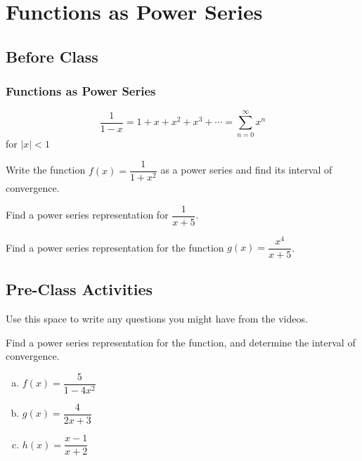 \documentclass[notes]{subfiles}
\begin{document}
	\fancyhead[LO,RE]{\bfseries \small \currentname}
	\fancyfoot[C]{{}}
	\fancyfoot[RO,LE]{\large \thepage}	%
	
\section*{Functions as Power Series}\label{cs119}
	\subsection*{Before Class}
	\subsubsection*{Functions as Power Series}
		\begin{rmk}[Recall]
			\[\dfrac{1}{1-x} = 1 + x + x^2 + x^3 + \cdots = \sum_{n=0}^\infty x^n\]
			for $|x| < 1$
		\end{rmk}
		\begin{ex}
			Write the function $f(x) = \dfrac{1}{1+x^2}$ as a power series and find its interval of convergence.
		\end{ex}
		
		\begin{ex}
			Find a power series representation for $\dfrac{1}{x + 5}$.
		\end{ex}
				
		\begin{ex}
			Find a power series representation for the function $g(x) = \dfrac{x^4}{x + 5}$.
		\end{ex}
			\newpage
			
	\subsection*{Pre-Class Activities}
		\begin{ex}
			Use this space to write any questions you might have from the videos.
		\end{ex}
			
		\begin{ex}
			Find a power series representation for the function, and determine the interval of convergence.
			\begin{enumerate}[(a)]
				\item $f(x) = \dfrac{5}{1-4x^2}$
					
				\item $g(x) = \dfrac{4}{2x+3}$
					
				\item $h(x) = \dfrac{x - 1}{x+2}$
			\end{enumerate}
		\end{ex}
			\newpage
			
\end{document}
